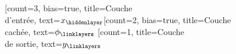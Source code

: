 \documentclass[10pt]{article}
\begin{document}
	\begin{neuralnetwork}[height=4]
		\newcommand{\nodetexthidden}[2]{$\phi_#2$}
		\newcommand{\nodetextx}[2]{$x_#2$}
		\newcommand{\nodetexty}[2]{$y_#2$}
		[count=3, bias=true, title=Couche\\d'entrée, text=\nodetextx]
		\hiddenlayer[count=2, bias=true, title=Couche\\cachée, text=\nodetexthidden] \linklayers
		\outputlayer[count=1, title=Couche\\{de sortie}, text=\nodetexty] \linklayers
	\end{neuralnetwork}
\end{document}
